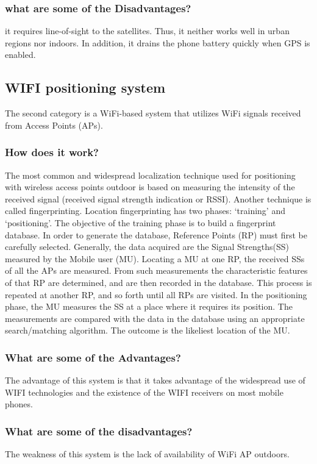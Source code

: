 \subsubsection{what are some of the Disadvantages?}
it requires line-of-sight to the satellites.
Thus, it neither works well in urban regions nor indoors.
In addition, it drains the phone battery quickly when GPS is enabled.\cite{8886005}
\subsection{WIFI positioning system}
The second category is a WiFi-based system that utilizes WiFi signals received from Access Points (APs).
\subsubsection{How does it work?}
The most common and widespread localization technique used for positioning with wireless access points  outdoor is based on measuring the intensity of the received signal (received signal strength indication or RSSI).
Another technique is called fingerprinting. Location fingerprinting has two phases: `training' and `positioning'. The objective of the training phase is to build a fingerprint database. In order to generate the database, Reference Points (RP) must first be carefully selected. Generally, the data acquired are the Signal Strengths(SS) measured by the Mobile user (MU). Locating a MU at one RP, the received SSs of all the APs are measured. From such measurements the characteristic features of that RP are determined, and are then recorded in the database. This process is repeated at another RP, and so forth until all RPs are visited. In the positioning phase, the MU measures the SS at a place where it requires its position. The measurements are compared with the data in the database using an appropriate search/matching algorithm. The outcome is the likeliest location of the MU.\cite{wifi}
\subsubsection{What are some of the Advantages?}
The advantage of this system is that it takes advantage of the widespread use of WIFI technologies and the existence of the WIFI receivers on most mobile phones.
\subsubsection{What are some of the disadvantages?}
The weakness of this system is the lack of availability of WiFi AP outdoors.
